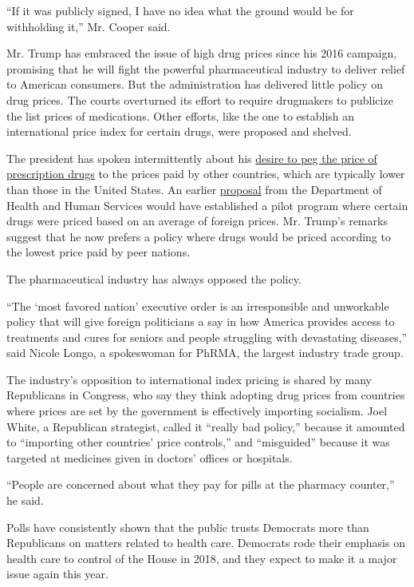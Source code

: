 ``If it was publicly signed, I have no idea what the ground would be for
withholding it,'' Mr. Cooper said.

Mr. Trump has embraced the issue of high drug prices since his 2016
campaign, promising that he will fight the powerful pharmaceutical
industry to deliver relief to American consumers. But the administration
has delivered little policy on drug prices. The courts overturned its
effort to require drugmakers to publicize the list prices of
medications. Other efforts, like the one to establish an international
price index for certain drugs, were proposed and shelved.

The president has spoken intermittently about his
\href{https://www.nytimes3xbfgragh.onion/2019/07/05/upshot/trump-drug-prices-executive-order.html}{desire
to peg the price of prescription drugs} to the prices paid by other
countries, which are typically lower than those in the United States. An
earlier
\href{https://www.nytimes3xbfgragh.onion/2018/10/25/us/politics/medicare-prescription-drug-costs-trump.html}{proposal}
from the Department of Health and Human Services would have established
a pilot program where certain drugs were priced based on an average of
foreign prices. Mr. Trump's remarks suggest that he now prefers a policy
where drugs would be priced according to the lowest price paid by peer
nations.

The pharmaceutical industry has always opposed the policy.

``The `most favored nation' executive order is an irresponsible and
unworkable policy that will give foreign politicians a say in how
America provides access to treatments and cures for seniors and people
struggling with devastating diseases,'' said Nicole Longo, a spokeswoman
for PhRMA, the largest industry trade group.

The industry's opposition to international index pricing is shared by
many Republicans in Congress, who say they think adopting drug prices
from countries where prices are set by the government is effectively
importing socialism. Joel White, a Republican strategist, called it
``really bad policy,'' because it amounted to ``importing other
countries' price controls,'' and ``misguided'' because it was targeted
at medicines given in doctors' offices or hospitals.

``People are concerned about what they pay for pills at the pharmacy
counter,'' he said.

Polls have consistently shown that the public trusts Democrats more than
Republicans on matters related to health care. Democrats rode their
emphasis on health care to control of the House in 2018, and they expect
to make it a major issue again this year.

